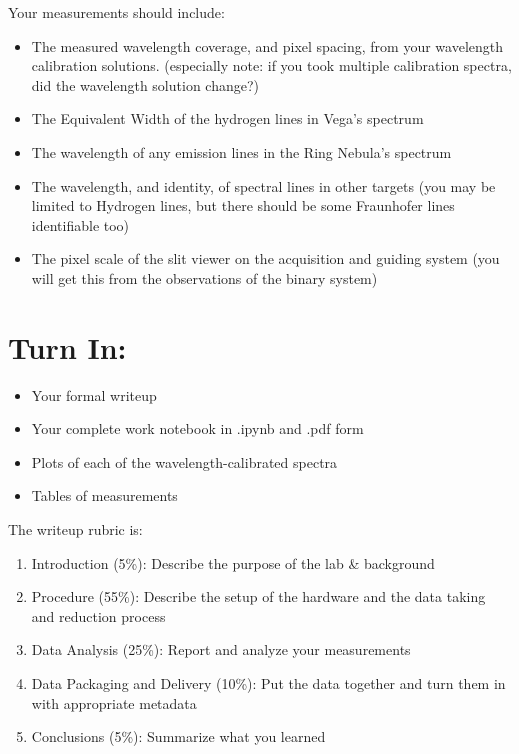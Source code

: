 \documentclass[11pt]{article}
\begin{document}
Your measurements should include:

\begin{itemize}
    \item The measured wavelength coverage, and pixel spacing, from your wavelength calibration solutions.
        (especially note: if you took multiple calibration spectra, did the wavelength solution change?)
    \item The Equivalent Width of the hydrogen lines in Vega's spectrum
    \item The wavelength of any emission lines in the Ring Nebula's spectrum
    \item The wavelength, and identity, of spectral lines in other targets (you may be limited to Hydrogen lines, but there should be some Fraunhofer lines identifiable too)
    \item The pixel scale of the slit viewer on the acquisition and guiding system (you will get this from the observations of the binary system)
\end{itemize}


\section{Turn In:}
\begin{itemize}
    \item Your formal writeup
    \item Your complete work notebook in .ipynb and .pdf form
    \item Plots of each of the wavelength-calibrated spectra
    \item Tables of measurements
\end{itemize}


The writeup rubric is:
\begin{enumerate}
    \item Introduction (5\%): Describe the purpose of the lab \& background
    \item Procedure (55\%): Describe the setup of the hardware and the data taking and reduction process
    \item Data Analysis (25\%):  Report and analyze your measurements
    \item Data Packaging and Delivery (10\%): Put the data together and turn them in with appropriate metadata
    \item Conclusions (5\%): Summarize what you learned
\end{enumerate}
\end{document}
